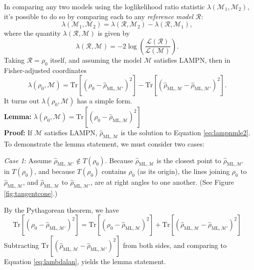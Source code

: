\documentclass[aps,pra, twocolumn]{revtex4-1}
\newcommand{\M}{\mathcal{M}}
\newcommand{\cL}{\mathcal{L}}
\newcommand{\rhohat}{\hat{\rho}}
\newcommand{\rhoML}[1]{\rhohat_{\scriptscriptstyle{\mathrm{ML},#1}}}
\begin{document}
In comparing any two models using the loglikelihood ratio statistic $\lambda(\M_{1}, \M_{2})$, it's possible to do so by comparing each to any \emph{reference model} $\mathcal{R}$: 
\[\lambda(\M_{1}, \M_{2}) = \lambda(\mathcal{R},\M_{2}) - \lambda(\mathcal{R},\M_{1}),\]
where the quantity $\lambda(\mathcal{R}, \M)$ is given by
\[\lambda(\mathcal{R}, \M) = -2 \log \left(\frac{\cL(\mathcal{R})}{\cL(\M)}\right).\]
Taking $\mathcal{R} = \rho_{0}$ itself, and assuming the model $\M$ satisfies LAMPN, then in Fisher-adjusted coordinates
\begin{equation}
\label{eq:lambdalan}
\lambda(\rho_{0}, \M) = \mathrm{Tr}[(\rho_{0} - \rhoML{\M'})^{2}] -  \mathrm{Tr}[(\rhoML{\M} - \rhoML{\M'})^{2}].
\end{equation}
It turns out $\lambda(\rho_{0}, \M)$ has a simple form.
~\\
\textbf{Lemma:} $\lambda(\rho_{0}, \M) = \mathrm{Tr}[(\rho_{0} - \rhoML{\M})^{2}]$
~\\
\textbf{Proof:}
If $\M$ satisfies LAMPN, $\rhoML{\M}$ is the solution to Equation \eqref{eq:lampnmle2}. To demonstrate the lemma statement, we must consider two cases:

\emph{Case 1}: Assume $\rhoML{\M'} \not \in T(\rho_{0})$. Because $\rhoML{\M}$ is the closest point to $\rhoML{\M'}$ in $T(\rho_{0})$, and because $T(\rho_{0})$ contains $\rho_{0}$ (as its origin), the lines joining $\rho_{0}$ to $\rhoML{\M}$, and $\rhoML{\M}$ to $\rhoML{\M'}$, are at right angles to one another. (See Figure \ref{fig:tangentcone}.) 

 By the Pythagorean theorem, we have
\[\mathrm{Tr}[(\rho_{0} -\rhoML{\M'})^{2}] =  \mathrm{Tr}[(\rho_{0} - \rhoML{\M})^{2}] + \mathrm{Tr}[(\rhoML{\M} - \rhoML{\M'})^{2}]\]
Subtracting $\mathrm{Tr}[(\rhoML{\M} - \rhoML{\M'})^{2}]$ from both sides, and comparing to Equation \eqref{eq:lambdalan}, yields the lemma statement.
\end{document}
